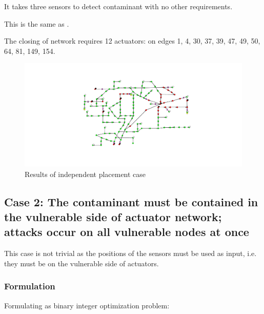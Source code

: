 \documentclass[authoryear,preprint,review,12pt]{elsarticle}
\begin{document}
It takes three sensors to detect contaminant with no other requirements.

This is the same as \cite{Palleti2016246}.

The closing of network requires 12 actuators: on edges 1, 4, 30, 37,
39, 47, 49, 50, 64, 81, 149, 154.

\begin{figure}[ht]
\begin{centering}
\includegraphics[width=\linewidth]{images/multiobj_indep}\caption{Results of independent placement case}

\par\end{centering}

\end{figure}







\subsection{Case 2: The contaminant must be contained in the vulnerable side
of actuator network; attacks occur on all vulnerable nodes at once}

This case is not trivial as the positions of the sensors must be used
as input, i.e. they must be on the vulnerable side of actuators.


\subsubsection{Formulation}

Formulating as binary integer optimization problem:
\end{document}
